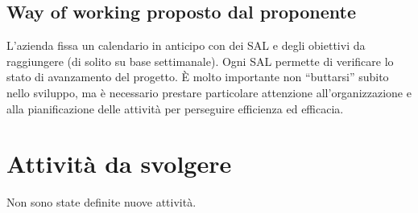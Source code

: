 \documentclass{article}
\begin{document}
    \subsection{Way of working proposto dal proponente}
        L’azienda fissa un calendario in anticipo con dei SAL e degli obiettivi da raggiungere (di solito su base settimanale).
        Ogni SAL permette di verificare lo stato di avanzamento del progetto. 
        È molto importante non “buttarsi” subito nello sviluppo, ma è necessario prestare particolare attenzione all’organizzazione e alla pianificazione delle attività per perseguire efficienza ed efficacia. 

\section{Attività da svolgere}
    Non sono state definite nuove attività. 
\end{document}
